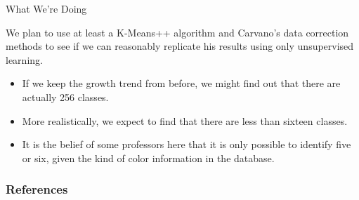\documentclass[10pt,xcolor={table,dvipsnames},t]{beamer}
\begin{document}
\begin{frame}{What We're Doing}

We plan to use at least a K-Means++ algorithm and Carvano's data correction methods to see if we can reasonably replicate his results using only unsupervised learning.
\begin{itemize}
    \item If we keep the growth trend from before, we might find out that there are actually 256 classes.
    \item More realistically, we expect to find that there are less than sixteen classes.
    \item It is the belief of some professors here that it is only possible to identify five or six, given the kind of color information in the database.
\end{itemize}
\end{frame}

\begin{frame}
\frametitle{References}




\end{frame}
\end{document}
